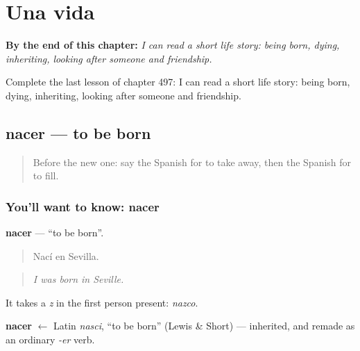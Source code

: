 
\chapter{Una vida}
\label{ch:es-una-vida}

\begin{chapteropening}
\textbf{By the end of this chapter:} \emph{I can read a short life story: being born, dying, inheriting, looking after someone and friendship.}

Complete the last lesson of chapter 497: I can read a short life story: being born, dying, inheriting, looking after someone and friendship.
\end{chapteropening}

\section[nacer]{nacer — to be born}

\label{lesson:ES-C497-nacer}



\begin{quote}
Before the new one: say the Spanish for to take away, then the Spanish for to fill.
\end{quote}

\subsection*{You'll want to know: nacer}
\textbf{nacer} — \textquotedblleft{}to be born\textquotedblright{}.

\begin{quote}
Nací en Sevilla.
\end{quote}

\begin{quote}
\emph{I was born in Seville.}
\end{quote}

It takes a \emph{z} in the first person present: \emph{nazco}.

\begin{cousinweb}
\textbf{nacer} $\leftarrow$ Latin \emph{nasci}, \textquotedblleft{}to be born\textquotedblright{} (Lewis \& Short) — inherited, and remade as an ordinary \emph{-er} verb.
\end{cousinweb}

